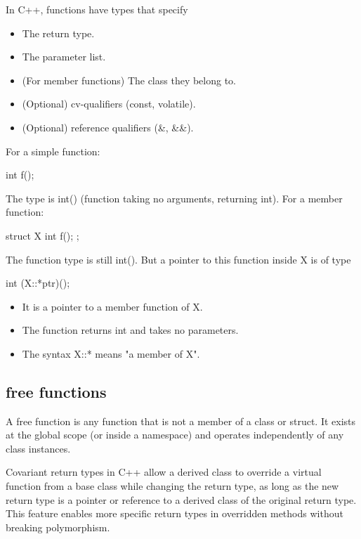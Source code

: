 \documentclass{report}
\begin{document}
\pagebreak 
{}
\bigbreak \noindent 
In C++, functions have types that specify
\begin{itemize}
    \item The return type.
    \item The parameter list.
    \item (For member functions) The class they belong to.
    \item (Optional) cv-qualifiers (const, volatile).
    \item (Optional) reference qualifiers (\&, \&\&).
\end{itemize}
\bigbreak \noindent 
For a simple function:
\bigbreak \noindent 
\begin{cppcode}
int f();
\end{cppcode}
\bigbreak \noindent 
The type is int() (function taking no arguments, returning int).
\bigbreak \noindent 
For a member function:
\bigbreak \noindent 
\begin{cppcode}
struct X {
    int f();
};
\end{cppcode}
\bigbreak \noindent 
The function type is still int(). But a pointer to this function inside X is of type
\bigbreak \noindent 
\begin{cppcode}
int (X::*ptr)();
\end{cppcode}
\begin{itemize}
    \item It is a pointer to a member function of X.
    \item The function returns int and takes no parameters.
    \item The syntax X::* means "a member of X".
\end{itemize}
\bigbreak \noindent 
\subsection{free functions}
\bigbreak \noindent 
A free function is any function that is not a member of a class or struct. It exists at the global scope (or inside a namespace) and operates independently of any class instances.

\pagebreak 
{}
\bigbreak \noindent 
Covariant return types in C++ allow a derived class to override a virtual function from a base class while changing the return type, as long as the new return type is a pointer or reference to a derived class of the original return type. This feature enables more specific return types in overridden methods without breaking polymorphism.
\bigbreak \noindent 
\end{document}
